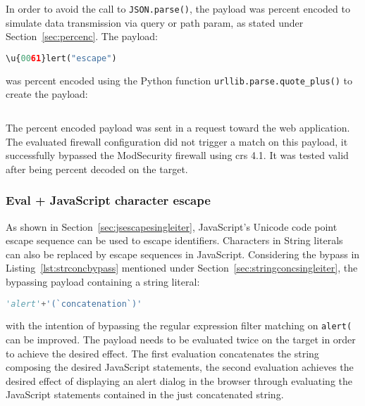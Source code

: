 In order to avoid the call to \verb|JSON.parse()|, the payload was percent encoded to simulate data transmission via query or path param, as stated under Section~\ref{sec:percenc}. The payload:

\begin{lstlisting}[style=basicStyle, escapeinside=\^\^, language=Python]
\u{0061}lert("escape")
\end{lstlisting}

was percent encoded using the Python function \verb|urllib.parse.quote_plus()| to create the payload:

\begin{lstlisting}[style=basicStyle, escapeinside=\^\^, language=Python, caption=JS Character Escape + Percent Encoding bypass]
%5Cu%7B0061%7Dlert%28%27escape%27%29
\end{lstlisting}

The percent encoded payload was sent in a request toward the web application. The evaluated firewall configuration did not trigger a match on this payload, it successfully bypassed the ModSecurity firewall using \acrshort{crs} 4.1. It was tested valid after being percent decoded on the target.

\subsubsection{Eval + JavaScript character escape}
\label{sec:jsescapemultiiter}
As shown in Section~\ref{sec:jsescapesingleiter}, JavaScript's Unicode code point escape sequence can be used to escape identifiers.
Characters in String literals can also be replaced by escape sequences in JavaScript. Considering the bypass in Listing~\ref{lst:strconcbypass} mentioned under Section~\ref{sec:stringconcsingleiter}, the bypassing payload containing a string literal:

\begin{lstlisting}[style=basicStyle, language=Python]
'alert'+'(`concatenation`)'
\end{lstlisting}

with the intention of bypassing the regular expression filter matching on \verb|alert(| can be improved. The payload needs to be evaluated twice on the target in order to achieve the desired effect. The first evaluation concatenates the string composing the desired JavaScript statements, the second evaluation achieves the desired effect of displaying an alert dialog in the browser through evaluating the JavaScript statements contained in the just concatenated string.

